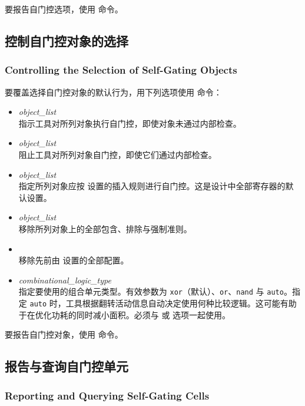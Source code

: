 要报告自门控选项，使用  命令。

\subsection{控制自门控对象的选择}
\subsubsection*{Controlling the Selection of Self-Gating Objects}

要覆盖选择自门控对象的默认行为，用下列选项使用  命令：
\begin{itemize}
  \item {} \textit{object\_list}\\
    指示工具对所列对象执行自门控，即使对象未通过内部检查。
  \item {} \textit{object\_list}\\
    阻止工具对所列对象自门控，即使它们通过内部检查。
  \item {} \textit{object\_list}\\
    指定所列对象应按  设置的插入规则进行自门控。这是设计中全部寄存器的默认设置。
  \item {} \textit{object\_list}\\
    移除所列对象上的全部包含、排除与强制准则。
  \item {}\\
    移除先前由  设置的全部配置。
  \item {} \textit{combinational\_logic\_type}\\
    指定要使用的组合单元类型。有效参数为 \texttt{xor}（默认）、\texttt{or}、\texttt{nand} 与 \texttt{auto}。指定 \texttt{auto} 时，工具根据翻转活动信息自动决定使用何种比较逻辑。这可能有助于在优化功耗的同时减小面积。必须与  或  选项一起使用。
\end{itemize}

要报告自门控对象，使用  命令。

\subsection{报告与查询自门控单元}
\subsubsection*{Reporting and Querying Self-Gating Cells}

